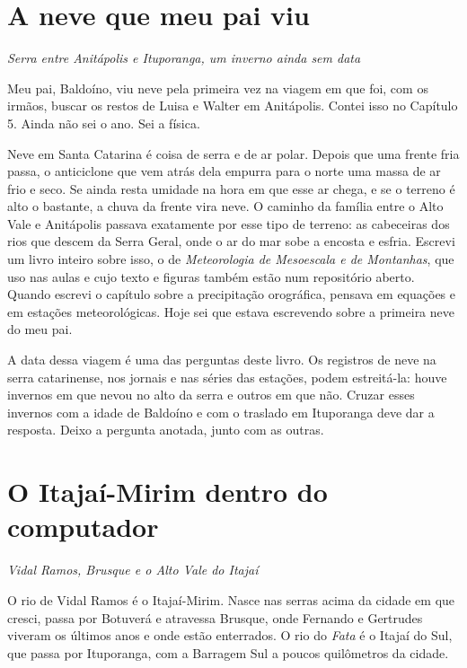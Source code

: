 \documentclass[
  brazilian,
  11pt,
  openany]{book}
\begin{document}
\section{A neve que meu pai viu}\label{a-neve-que-meu-pai-viu}

\emph{Serra entre Anitápolis e Ituporanga, um inverno ainda sem data}

Meu pai, Baldoíno, viu neve pela primeira vez na viagem em que foi, com
os irmãos, buscar os restos de Luisa e Walter em Anitápolis. Contei isso
no Capítulo 5. Ainda não sei o ano. Sei a física.

Neve em Santa Catarina é coisa de serra e de ar polar. Depois que uma
frente fria passa, o anticiclone que vem atrás dela empurra para o norte
uma massa de ar frio e seco. Se ainda resta umidade na hora em que esse
ar chega, e se o terreno é alto o bastante, a chuva da frente vira neve.
O caminho da família entre o Alto Vale e Anitápolis passava exatamente
por esse tipo de terreno: as cabeceiras dos rios que descem da Serra
Geral, onde o ar do mar sobe a encosta e esfria. Escrevi um livro
inteiro sobre isso, o de \emph{Meteorologia de Mesoescala e de
Montanhas}, que uso nas aulas e cujo texto e figuras também estão num
repositório aberto. Quando escrevi o capítulo sobre a precipitação
orográfica, pensava em equações e em estações meteorológicas. Hoje sei
que estava escrevendo sobre a primeira neve do meu pai.

A data dessa viagem é uma das perguntas deste livro. Os registros de
neve na serra catarinense, nos jornais e nas séries das estações, podem
estreitá-la: houve invernos em que nevou no alto da serra e outros em
que não. Cruzar esses invernos com a idade de Baldoíno e com o traslado
em Ituporanga deve dar a resposta. Deixo a pergunta anotada, junto com
as outras.

\section{O Itajaí-Mirim dentro do
computador}\label{o-itajauxed-mirim-dentro-do-computador}

\emph{Vidal Ramos, Brusque e o Alto Vale do Itajaí}

O rio de Vidal Ramos é o Itajaí-Mirim. Nasce nas serras acima da cidade
em que cresci, passa por Botuverá e atravessa Brusque, onde Fernando e
Gertrudes viveram os últimos anos e onde estão enterrados. O rio do
\emph{Fata} é o Itajaí do Sul, que passa por Ituporanga, com a Barragem
Sul a poucos quilômetros da cidade.
\end{document}
